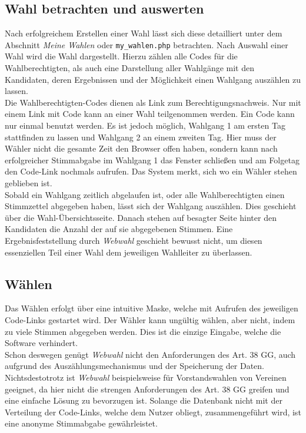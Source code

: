 \documentclass[a4paper]{scrartcl}
\newcommand{\file}[1]{\texttt{#1}}
\begin{document}
	\subsection{Wahl betrachten und auswerten}
	Nach erfolgreichem Erstellen einer Wahl lässt sich diese detailliert unter dem Abschnitt \textit{Meine Wahlen} oder \file{my\_wahlen.php} betrachten. Nach Auswahl einer Wahl wird die Wahl dargestellt. Hierzu zählen alle Codes für die Wahlberechtigten, als auch eine Darstellung aller Wahlgänge mit den Kandidaten, deren Ergebnissen und der Möglichkeit einen Wahlgang auszählen zu lassen.\\
	
	\noindent Die Wahlberechtigten-Codes dienen als Link zum Berechtigungsnachweis. Nur mit einem Link mit Code kann an einer Wahl teilgenommen werden. Ein Code kann nur einmal benutzt werden. Es ist jedoch möglich, Wahlgang 1 am ersten Tag stattfinden zu lassen und Wahlgang 2 an einem zweiten Tag. Hier muss der Wähler nicht die gesamte Zeit den Browser offen haben, sondern kann nach erfolgreicher Stimmabgabe im Wahlgang 1 das Fenster schließen und am Folgetag den Code-Link nochmals aufrufen. Das System merkt, sich wo ein Wähler stehen geblieben ist.\\
	
	\noindent Sobald ein Wahlgang zeitlich abgelaufen ist, oder alle Wahlberechtigten einen Stimmzettel abgegeben haben, lässt sich der Wahlgang auszählen. Dies geschieht über die Wahl-Übersichtsseite. Danach stehen auf besagter Seite hinter den Kandidaten die Anzahl der auf sie abgegebenen Stimmen. Eine Ergebnisfeststellung durch \textit{Webwahl} geschieht bewusst nicht, um diesen essenziellen Teil einer Wahl dem jeweiligen Wahlleiter zu überlassen.
	
	\subsection{Wählen}
	Das Wählen erfolgt über eine intuitive Maske, welche mit Aufrufen des jeweiligen Code-Links gestartet wird. Der Wähler kann ungültig wählen, aber nicht, indem zu viele Stimmen abgegeben werden. Dies ist die einzige Eingabe, welche die Software verhindert.\\
	
	\noindent Schon deswegen genügt \textit{Webwahl} nicht den Anforderungen des Art. 38 GG, auch aufgrund des Auszählungsmechanismus und der Speicherung der Daten. Nichtsdestotrotz ist \textit{Webwahl} beispielsweise für Vorstandswahlen von Vereinen geeignet, da hier nicht die strengen Anforderungen des Art. 38 GG greifen und eine einfache Lösung zu bevorzugen ist. Solange die Datenbank nicht mit der Verteilung der Code-Links, welche dem Nutzer obliegt, zusammengeführt wird, ist eine anonyme Stimmabgabe gewährleistet.
	
	
	
	
	
	
\end{document}
